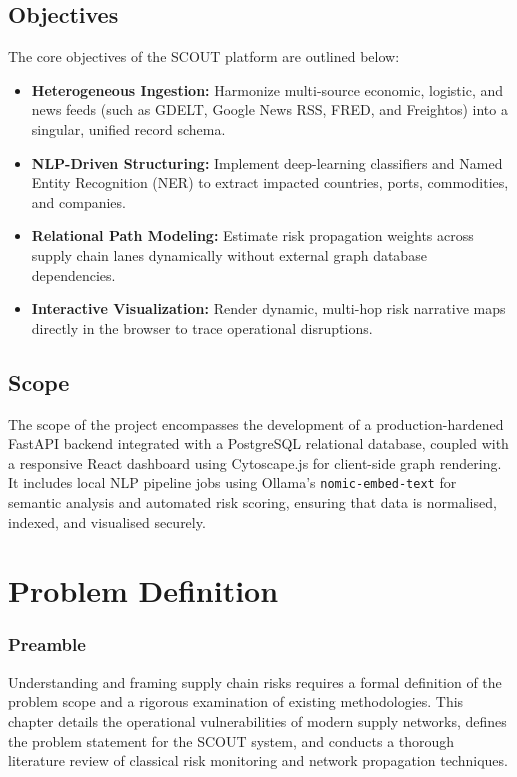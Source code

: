 \documentclass[12pt]{report}
\begin{document}
\section{Objectives}
The core objectives of the SCOUT platform are outlined below:
\begin{itemize}
  \item \textbf{Heterogeneous Ingestion:} Harmonize multi-source economic, logistic, and news feeds (such as GDELT, Google News RSS, FRED, and Freightos) into a singular, unified record schema.
  \item \textbf{NLP-Driven Structuring:} Implement deep-learning classifiers and Named Entity Recognition (NER) to extract impacted countries, ports, commodities, and companies.
  \item \textbf{Relational Path Modeling:} Estimate risk propagation weights across supply chain lanes dynamically without external graph database dependencies.
  \item \textbf{Interactive Visualization:} Render dynamic, multi-hop risk narrative maps directly in the browser to trace operational disruptions.
\end{itemize}

\section{Scope}
The scope of the project encompasses the development of a production-hardened FastAPI backend integrated with a PostgreSQL relational database, coupled with a responsive React dashboard using Cytoscape.js for client-side graph rendering. It includes local NLP pipeline jobs using Ollama's \texttt{nomic-embed-text} for semantic analysis and automated risk scoring, ensuring that data is normalised, indexed, and visualised securely.

\newpage
\chapter{Problem Definition}
\thispagestyle{fancy}

\subsection{Preamble}
Understanding and framing supply chain risks requires a formal definition of the problem scope and a rigorous examination of existing methodologies. This chapter details the operational vulnerabilities of modern supply networks, defines the problem statement for the SCOUT system, and conducts a thorough literature review of classical risk monitoring and network propagation techniques.
\end{document}

